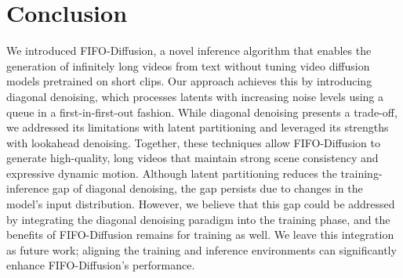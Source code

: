 



\section{Conclusion}
\label{sec:conclusion}
We introduced FIFO-Diffusion, a novel inference algorithm that enables the generation of infinitely long videos from text without tuning video diffusion models pretrained on short clips. 
Our approach achieves this by introducing diagonal denoising, which processes latents with increasing noise levels using a queue in a first-in-first-out fashion.
While diagonal denoising presents a trade-off, we addressed its limitations with latent partitioning and leveraged its strengths with lookahead denoising.
Together, these techniques allow FIFO-Diffusion to generate high-quality, long videos that maintain strong scene consistency and expressive dynamic motion.
Although latent partitioning reduces the training-inference gap of diagonal denoising, the gap persists due to changes in the model's input distribution.
However, we believe that this gap could be addressed by integrating the diagonal denoising paradigm into the training phase, and the benefits of FIFO-Diffusion remains for training as well. 
We leave this integration as future work; aligning the training and inference environments can significantly enhance FIFO-Diffusion's performance.




